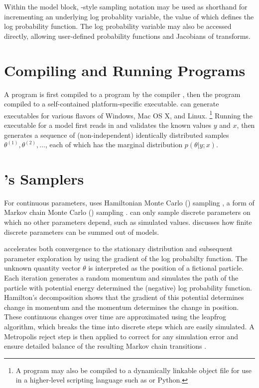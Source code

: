 Within the model block, \BUGS-style sampling notation may be used as
shorthand for incrementing an underlying log probablity variable, the
value of which defines the log probability function.  The log
probability variable may also be accessed directly, allowing
user-defined probability functions and Jacobians of transforms.


\section{Compiling and Running \Stan Programs}

A \Stan program is first compiled to a \Cpp program by the \Stan
compiler \stanc, then the \Cpp program compiled to a self-contained
platform-specific executable.  \Stan can generate executables for
various flavors of Windows, Mac OS X, and Linux.%
%
\footnote{A \Stan program may also be compiled to a dynamically
  linkable object file for use in a higher-level scripting language
  such as \R or Python.}
%
Running the \Stan executable for a model first reads in and validates
the known values $y$ and $x$, then generates a sequence of
(non-independent) identically distributed samples $\theta^{(1)},
\theta^{(2)}, \ldots$, each of which has the marginal distribution
$p(\theta|y;x)$.


\section{\Stan's Samplers}

For continuous parameters, \Stan uses Hamiltonian Monte Carlo (\HMC)
sampling \citep{Duane:1987, Neal:1994, Neal:2011}, a form of Markov chain Monte
Carlo (\MCMC) sampling \citep{Metropolis:1953}.   can only sample discrete parameters
on which no other parameters depend, such as simulated values.
 discusses how finite discrete parameters
can be summed out of models.

\HMC accelerates both convergence to the stationary distribution and
subsequent parameter exploration by using the gradient of the log
probabilty function.  The unknown quantity vector $\theta$ is
interpreted as the position of a fictional particle.  Each iteration
generates a random momentum and simulates the path of the particle
with potential energy determined the (negative) log probability
function.  Hamilton's decomposition shows that the gradient of this
potential determines change in momentum and the momentum determines
the change in position.  These continuous changes over time are
approximated using the leapfrog algorithm, which breaks the time into
discrete steps which are easily simulated.  A Metropolis reject step
is then applied to correct for any simulation error and ensure
detailed balance of the resulting Markov chain transitions
\citep{Metropolis:1953, Hastings:1970}.

